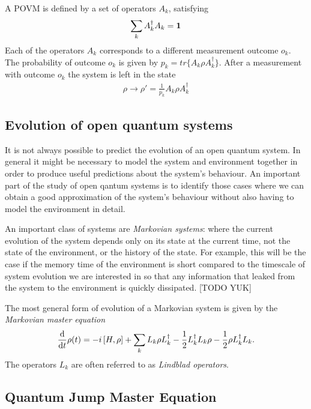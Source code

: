 A POVM  is defined by a set of operators $A_k$, satisfying
\begin{align}
  \label{POVM_completeness_eq}
  \sum_k A_k^\dagger A_k = \mathbf{1}
\end{align}
Each of the operators $A_k$ corresponds to a different measurement outcome $o_k$. The probability of outcome $o_k$ is given by $p_k = tr\{A_k \rho A_k^\dagger\}$. After a measurement with outcome $o_k$ the system is left in the state
\begin{align}\label{POVM_normalisation_eq}
  \rho \rightarrow \rho' = \frac{1}{p_k} A_k \rho A_k^\dagger
\end{align}

\subsection{Evolution of open quantum systems}

It is not always possible to predict the evolution of an open quantum system. In general it might be necessary to model the system and environment together in order to produce useful predictions about the system's behaviour. An important part of the study of open qantum systems is to identify those cases where we can obtain a good approximation of the system's behaviour without also having to model the environment in detail.

An important class of systems are \textit{Markovian systems}: where the current evolution of the system depends only on its state at the current time, not the state of the environment, or the history of the state. For example, this will be the case if the memory time of the environment is short compared to the timescale of system evolution we are interested in so that any information that leaked from the system to the environment is quickly dissipated. [TODO YUK]

The most general form \cite{lindblad} of evolution of a Markovian system is given by the \textit{Markovian master equation}
\begin{align}\label{master_eq}
  \frac{\mathrm{d}}{\mathrm{d}t} \rho(t) = -i \left[H, \rho\right] + \sum_k L_k \rho L_k^\dagger -\frac{1}{2} L_k^\dagger L_k \rho -\frac{1}{2} \rho L_k^\dagger L_k .
\end{align}
The operators $L_k$ are often referred to as \textit{Lindblad operators}. 

\subsection{Quantum Jump Master Equation}

